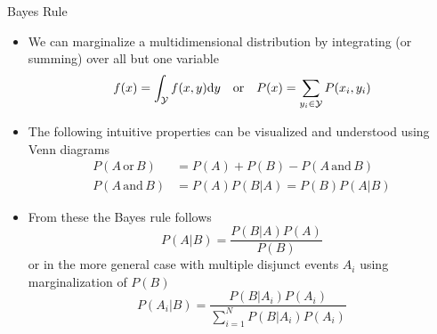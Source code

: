   \begin{frame}{Bayes Rule}
    \begin{itemize}
      \item We can marginalize a multidimensional distribution by integrating (or summing) over all but one variable
        \begin{equation*}
          f(x) = \int_\mathcal{Y}f(x,y)\mathrm{d}y
          \quad\text{or}\quad
          P(x) = \sum_{y_i\in\mathcal{Y}} P(x_i, y_i)
        \end{equation*}
        \item The following intuitive properties can be visualized and understood using Venn diagrams
          \begin{align*}
            P(A\,\text{or}\,B) &= P(A) + P(B) - P(A\,\text{and}\,B) \\
            P(A\,\text{and}\,B) &= P(A) P(B|A) = P(B) P(A|B)
          \end{align*}
        \item From these the Bayes rule follows
          \begin{equation*}
            P(A|B) = \frac{P(B|A) P(A)}{P(B)}
          \end{equation*}
          or in the more general case with multiple disjunct events $A_i$ using marginalization of $P(B)$
          \begin{equation*}
            P(A_i|B) = \frac{P(B|A_i) P(A_i)}{\sum_{i=1}^N P(B|A_i)P(A_i)}
          \end{equation*}
    \end{itemize}
  \end{frame}

